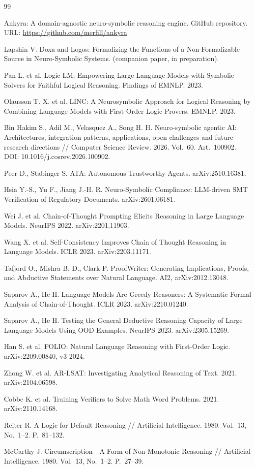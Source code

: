 \documentclass[11pt,a4paper]{article}
\begin{document}
\begin{thebibliography}{99}

	 Ankyra: A domain-agnostic neuro-symbolic reasoning engine. GitHub repository. URL: \url{https://github.com/merfill/ankyra}

	 Lapshin V. Doxa and Logos: Formalizing the Functions of a Non-Formalizable Source in Neuro-Symbolic Systems. (companion paper, in preparation).

	 Pan L. et al. Logic-LM: Empowering Large Language Models with Symbolic Solvers for Faithful Logical Reasoning. Findings of EMNLP. 2023.

	 Olausson T. X. et al. LINC: A Neurosymbolic Approach for Logical Reasoning by Combining Language Models with First-Order Logic Provers. EMNLP. 2023.

	 Bin Hakim S., Adil M., Velasquez A., Song H. H. Neuro-symbolic agentic AI: Architectures, integration patterns, applications, open challenges and future research directions // Computer Science Review. 2026. Vol.~60. Art.~100902. DOI: 10.1016/j.cosrev.2026.100902.

 Peer D., Stabinger S. ATA: Autonomous Trustworthy Agents. arXiv:2510.16381.

	 Hsia Y.-S., Yu F., Jiang J.-H. R. Neuro-Symbolic Compliance: LLM-driven SMT Verification of Regulatory Documents. arXiv:2601.06181.

	 Wei J. et al. Chain-of-Thought Prompting Elicits Reasoning in Large Language Models. NeurIPS 2022. arXiv:2201.11903.

	 Wang X. et al. Self-Consistency Improves Chain of Thought Reasoning in Language Models. ICLR 2023. arXiv:2203.11171.

	 Tafjord O., Mishra B. D., Clark P. ProofWriter: Generating Implications, Proofs, and Abductive Statements over Natural Language. AI2, arXiv:2012.13048.

	 Saparov A., He H. Language Models Are Greedy Reasoners: A Systematic Formal Analysis of Chain-of-Thought. ICLR 2023. arXiv:2210.01240.

	 Saparov A., He H. Testing the General Deductive Reasoning Capacity of Large Language Models Using OOD Examples. NeurIPS 2023. arXiv:2305.15269.

	 Han S. et al. FOLIO: Natural Language Reasoning with First-Order Logic. arXiv:2209.00840, v3 2024.

	 Zhong W. et al. AR-LSAT: Investigating Analytical Reasoning of Text. 2021. arXiv:2104.06598.

	 Cobbe K. et al. Training Verifiers to Solve Math Word Problems. 2021. arXiv:2110.14168.

	 Reiter R. A Logic for Default Reasoning // Artificial Intelligence. 1980. Vol.~13, No.~1--2. P.~81--132.

	 McCarthy J. Circumscription---A Form of Non-Monotonic Reasoning // Artificial Intelligence. 1980. Vol.~13, No.~1--2. P.~27--39.

	\end{thebibliography}
\end{document}
